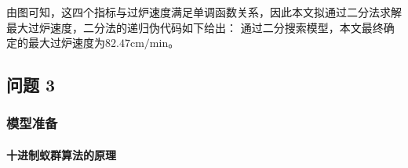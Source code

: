 \documentclass[../main.tex]{subfiles}
\begin{document}
由图可知，这四个指标与过炉速度满足单调函数关系，因此本文拟通过二分法求解最大过炉速度，二分法的递归伪代码如下给出：
% 
% 
% 
% 
% 
通过二分搜索模型，本文最终确定的最大过炉速度为\(82.47 \mathrm{cm}/\mathrm{min}\)。

\subsection{问题 3}

\subsubsection{模型准备}

\paragraph{十进制蚁群算法的原理}
\end{document}
